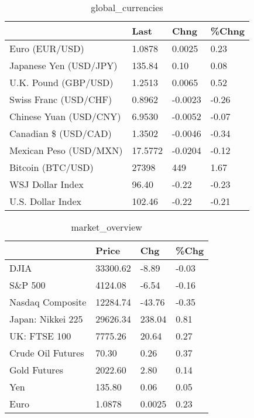 \documentclass{article}%
\begin{document}
%


\begin{table}[htbp]%
\caption{global\_currencies}%
\centering%
\begin{adjustbox}{width=1\textwidth}%
\begin{tabular}{llll}
\toprule
                       &    Last &    Chng & \%Chng \\
\midrule
        Euro (EUR/USD) &  1.0878 &  0.0025 &  0.23 \\
Japanese Yen (USD/JPY) &  135.84 &    0.10 &  0.08 \\
  U.K. Pound (GBP/USD) &  1.2513 &  0.0065 &  0.52 \\
 Swiss Franc (USD/CHF) &  0.8962 & -0.0023 & -0.26 \\
Chinese Yuan (USD/CNY) &  6.9530 & -0.0052 & -0.07 \\
  Canadian \$ (USD/CAD) &  1.3502 & -0.0046 & -0.34 \\
Mexican Peso (USD/MXN) & 17.5772 & -0.0204 & -0.12 \\
     Bitcoin (BTC/USD) &   27398 &     449 &  1.67 \\
      WSJ Dollar Index &   96.40 &   -0.22 & -0.23 \\
     U.S. Dollar Index &  102.46 &   -0.22 & -0.21 \\
\bottomrule
\end{tabular}
%
\end{adjustbox}%
\end{table}

%


\begin{table}[htbp]%
\caption{market\_overview}%
\centering%
\begin{adjustbox}{width=1\textwidth}%
\begin{tabular}{llll}
\toprule
                  &    Price &    Chg &  \%Chg \\
\midrule
             DJIA & 33300.62 &  -8.89 & -0.03 \\
          S\&P 500 &  4124.08 &  -6.54 & -0.16 \\
 Nasdaq Composite & 12284.74 & -43.76 & -0.35 \\
Japan: Nikkei 225 & 29626.34 & 238.04 &  0.81 \\
     UK: FTSE 100 &  7775.26 &  20.64 &  0.27 \\
Crude Oil Futures &    70.30 &   0.26 &  0.37 \\
     Gold Futures &  2022.60 &   2.80 &  0.14 \\
              Yen &   135.80 &   0.06 &  0.05 \\
             Euro &   1.0878 & 0.0025 &  0.23 \\
\bottomrule
\end{tabular}
%
\end{adjustbox}%
\end{table}

%
\end{document}

